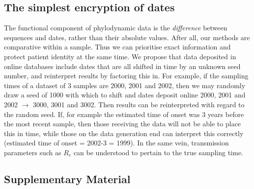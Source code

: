 \documentclass{article}
\begin{document}
\begin{spacing}{1.5}
\subsection*{The simplest encryption of dates}
The functional component of phylodynamic data is the \emph{difference} between sequences and dates, rather than their absolute values. After all, our methods are comparative within a sample. Thus we can prioritise exact information and protect patient identity at the same time. We propose that data deposited in online databases include dates that are all shifted in time by an unknown seed number, and reinterpret results by factoring this in. For example, if the sampling times of a dataset of 3 samples are 2000, 2001 and 2002, then we may randomly draw a seed of 1000 with which to shift and dates deposit online 2000, 2001 and 2002 $\rightarrow$ 3000, 3001 and 3002. Then results can be reinterpreted with regard to the random seed. If, for example the estimated time of onset was 3 years before the most recent sample, then those receiving the data will not be able to place this in time, while those on the data generation end can interpret this correctly (estimated time of onset = 2002-3 = 1999). In the same vein, transmission parameters such as $R_e$ can be understood to pertain to the true sampling time.

\end{spacing}




\subsection*{Supplementary Material}

\renewcommand{\thefigure}{S\arabic{figure}}
\setcounter{figure}{0}
\end{document}
